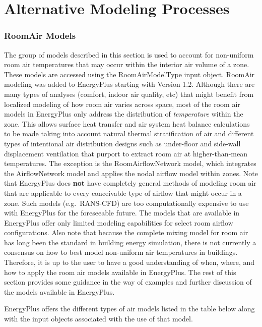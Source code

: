 \chapter{Alternative Modeling Processes}\label{alternative-modeling-processes}

\subsection{RoomAir Models}\label{roomair-models}

The group of models described in this section is used to account for non-uniform room air temperatures that may occur within the interior air volume of a zone. These models are accessed using the RoomAirModelType input object. RoomAir modeling was added to EnergyPlus starting with Version 1.2. Although there are many types of analyses (comfort, indoor air quality, etc) that might benefit from localized modeling of how room air varies across space, most of the room air models in EnergyPlus only address the distribution of \emph{temperature} within the zone. This allows surface heat transfer and air system heat balance calculations to be made taking into account natural thermal stratification of air and different types of intentional air distribution designs such as under-floor and side-wall displacement ventilation that purport to extract room air at higher-than-mean temperatures. The exception is the RoomAirflowNetwork model, which integrates the AirflowNetwork model and applies the nodal airflow model within zones. Note that EnergyPlus does \textbf{not} have completely general methods of modeling room air that are applicable to every conceivable type of airflow that might occur in a zone. Such models (e.g.~RANS-CFD) are too computationally expensive to use with EnergyPlus for the foreseeable future. The models that are available in EnergyPlus offer only limited modeling capabilities for select room airflow configurations. Also note that because the complete mixing model for room air has long been the standard in building energy simulation, there is not currently a consensus on how to best model non-uniform air temperatures in buildings. Therefore, it is up to the user to have a good understanding of when, where, and how to apply the room air models available in EnergyPlus. The rest of this section provides some guidance in the way of examples and further discussion of the models available in EnergyPlus.

EnergyPlus offers the different types of air models listed in the table below along with the input objects associated with the use of that model.

